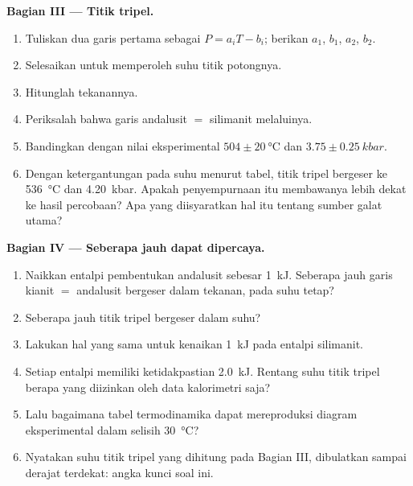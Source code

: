 \begin{problem}
\noindent\textbf{Bagian III --- Titik tripel.}
\begin{enumerate}[resume]
\item Tuliskan dua garis pertama sebagai $P = a_i T - b_i$; berikan $a_1$, $b_1$, $a_2$, $b_2$.
\item Selesaikan untuk memperoleh suhu titik potongnya.
\item Hitunglah tekanannya.
\item Periksalah bahwa garis andalusit $=$ silimanit melaluinya.
\item Bandingkan dengan nilai eksperimental $504 \pm \qty{20}{\celsius}$ dan $3.75 \pm
\qty{0.25}{kbar}$.
\item Dengan ketergantungan pada suhu menurut tabel, titik tripel bergeser ke
\qty{536}{\celsius} dan \qty{4.20}{kbar}. Apakah penyempurnaan itu membawanya lebih dekat ke
hasil percobaan? Apa yang diisyaratkan hal itu tentang sumber galat utama?
\end{enumerate}

\noindent\textbf{Bagian IV --- Seberapa jauh dapat dipercaya.}
\begin{enumerate}[resume]
\item Naikkan entalpi pembentukan andalusit sebesar \qty{1}{kJ}. Seberapa jauh
garis kianit $=$ andalusit bergeser dalam tekanan, pada suhu tetap?
\item Seberapa jauh titik tripel bergeser dalam suhu?
\item Lakukan hal yang sama untuk kenaikan \qty{1}{kJ} pada entalpi silimanit.
\item Setiap entalpi memiliki ketidakpastian \qty{2.0}{kJ}. Rentang suhu titik tripel
berapa yang diizinkan oleh data kalorimetri saja?
\item Lalu bagaimana tabel termodinamika dapat mereproduksi diagram eksperimental dalam selisih
\qty{30}{\celsius}?
\item Nyatakan suhu titik tripel yang dihitung pada Bagian III, dibulatkan sampai
derajat terdekat: angka kunci soal ini.
\end{enumerate}
\end{problem}
